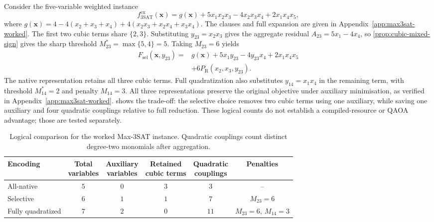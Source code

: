 \documentclass[a4paper,onecolumn,11pt,unpublished]{quantumarticle}
\newcommand{\PR}{P_{\mathrm R}}
\theoremstyle{remark}
\begin{document}
Consider the five-variable weighted instance
\begin{equation}
 f_{\mathrm{3SAT}}^{\mathrm{ex}}(\bm x)
 =g(\bm x)+5x_1x_2x_3-4x_2x_3x_4+2x_1x_4x_5,
 \label{eq:max3sat-worked-expanded}
\end{equation}
where $g(\bm x)=4-4(x_2+x_3+x_4)+4(x_2x_3+x_2x_4+x_3x_4)$.
The clauses and full expansion are given in
Appendix~\ref{app:max3sat-worked}.
The first two cubic terms share $\{2,3\}$. Substituting $y_{23}=x_2x_3$
gives the aggregate residual $A_{23}=5x_1-4x_4$, so
\cref{prop:cubic-mixed-sign} gives the sharp threshold
$M_{23}^{*}=\max\{5,4\}=5$. Taking $M_{23}=6$ yields
\begin{align}
 F_{\mathrm{sel}}(\bm x,y_{23})
 ={}&g(\bm x)+5x_1y_{23}-4y_{23}x_4+2x_1x_4x_5 \nonumber\\
 &+6\PR(x_2,x_3,y_{23}).
 \label{eq:max3sat-worked-selective}
\end{align}
The native representation retains all three cubic terms. Full quadratization
also substitutes $y_{14}=x_1x_4$ in the remaining term, with threshold
$M_{14}^{*}=2$ and penalty $M_{14}=3$. All three representations preserve
the original objective under auxiliary minimisation, as verified in
Appendix~\ref{app:max3sat-worked}.
 shows the trade-off: the selective choice
removes two cubic terms using one auxiliary, while saving one auxiliary and
four quadratic couplings relative to full reduction. These logical counts do
not establish a compiled-resource or QAOA advantage; those are tested separately.

\begin{table}[t]
    \centering
    \small
    \caption{Logical comparison for the worked Max-3SAT instance. Quadratic
    couplings count distinct degree-two monomials after aggregation.}
    \label{tab:max3sat-worked-comparison}
    \begin{tabular}{@{}lccccc@{}}
        \toprule
        Encoding
        & \shortstack{Total\\variables}
        & \shortstack{Auxiliary\\variables}
        & \shortstack{Retained\\cubic terms}
        & \shortstack{Quadratic\\couplings}
        & Penalties\\
        \midrule
        All-native & $5$ & $0$ & $3$ & $3$  & --\\
        Selective  & $6$ & $1$ & $1$ & $7$  & $M_{23}=6$\\
        Fully quadratized & $7$ & $2$ & $0$ & $11$
            & $M_{23}=6,\ M_{14}=3$\\
        \bottomrule
    \end{tabular}
\end{table}
\end{document}
